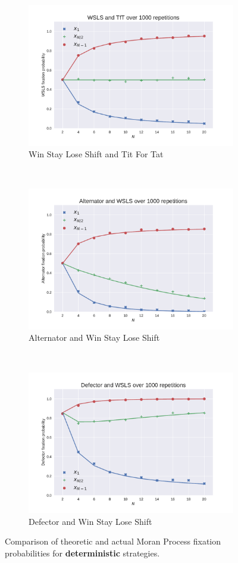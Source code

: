 \documentclass{article}
\begin{document}
\begin{figure}[!hbtp]
    \begin{subfigure}[t]{.3\textwidth}
        \centering
        \includegraphics[width=.8\textwidth]{./img/WSLS_v_TfT.pdf}
        \caption{Win Stay Lose Shift and Tit For Tat}
    \end{subfigure}%
    ~
    \begin{subfigure}[t]{.3\textwidth}
        \centering
        \includegraphics[width=.8\textwidth]{./img/Alternator_v_WSLS.pdf}
        \caption{Alternator and Win Stay Lose Shift}
    \end{subfigure}%
    ~
    \begin{subfigure}[t]{.3\textwidth}
        \centering
        \includegraphics[width=.8\textwidth]{./img/Defector_v_WSLS.pdf}
        \caption{Defector and Win Stay Lose Shift}
    \end{subfigure}%
    \caption{Comparison of theoretic and actual Moran Process fixation
             probabilities for \textbf{deterministic} strategies.}
    \label{fig:comparison_deterministic}
\end{figure}
\end{document}
